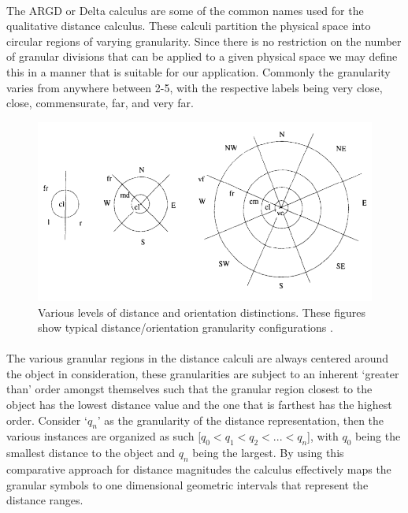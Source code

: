 	\paragraph{}The ARGD or Delta calculus are some of the common names used for the qualitative distance calculus. These calculi partition the physical space into circular regions of varying granularity. Since there is no restriction on the number of granular divisions that can be applied to a given physical space we may define this in a manner that is suitable for our application. Commonly the granularity varies from anywhere between 2-5, with the respective labels being very close, close, commensurate, far, and very far.
	
	\begin{figure}[h]
		\centering
		\includegraphics[width=0.7\linewidth]{images/distance_cal}
		\caption{ Various levels of distance and orientation distinctions. These figures show typical distance/orientation granularity configurations \cite{clementini1997qualitative}. }
		\label{fig:distancecal}
	\end{figure}
	
	\paragraph{} The various granular regions in the distance calculi are always centered around the object in consideration, these granularities are subject to an inherent `greater than' order amongst themselves such that the granular region closest to the object has the lowest distance value and the one that is farthest has the highest order. Consider `$q_n$' as the granularity of the distance representation, then the various instances are organized as such [$q_0 < q_1 < q_2 < . . . < q_n$], with $q_0$ being the smallest distance to the object and $q_n$ being the largest. By using this comparative approach for distance magnitudes the calculus effectively maps the granular symbols to one dimensional geometric intervals that represent the distance ranges.
	
